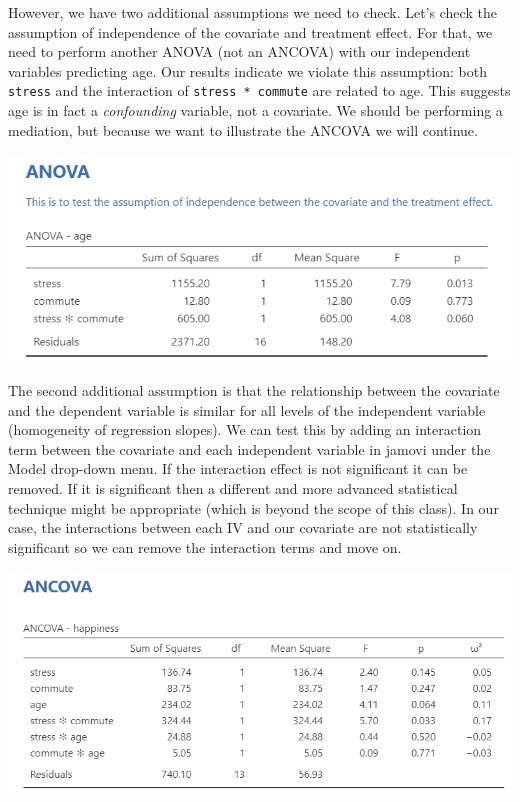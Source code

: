 \documentclass[
]{book}
\begin{document}
However, we have two additional assumptions we need to check. Let's check the assumption of independence of the covariate and treatment effect. For that, we need to perform another ANOVA (not an ANCOVA) with our independent variables predicting age. Our results indicate we violate this assumption: both \texttt{stress} and the interaction of \texttt{stress\ *\ commute} are related to age. This suggests age is in fact a \emph{confounding} variable, not a covariate. We should be performing a mediation, but because we want to illustrate the ANCOVA we will continue.

\includegraphics{images/07-ancova/ancova_assumptions2.png}

The second additional assumption is that the relationship between the covariate and the dependent variable is similar for all levels of the independent variable (homogeneity of regression slopes). We can test this by adding an interaction term between the covariate and each independent variable in jamovi under the Model drop-down menu. If the interaction effect is not significant it can be removed. If it is significant then a different and more advanced statistical technique might be appropriate (which is beyond the scope of this class). In our case, the interactions between each IV and our covariate are not statistically significant so we can remove the interaction terms and move on.

\includegraphics{images/07-ancova/ancova_assumptions3.png}
\end{document}
